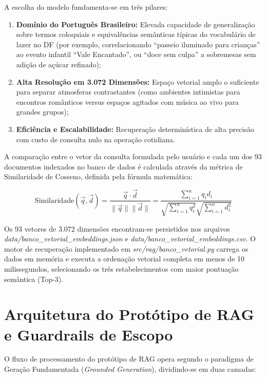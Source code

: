 \documentclass[11pt,a4paper]{article}
\begin{document}
A escolha do modelo fundamenta-se em três pilares:
\begin{enumerate}[label=\alph*)]
\item \textbf{Domínio do Português Brasileiro:} Elevada capacidade de generalização sobre termos coloquiais e equivalências semânticas típicas do vocabulário de lazer no DF (por exemplo, correlacionando ``passeio iluminado para crianças'' ao evento infantil ``Vale Encantado'', ou ``doce sem culpa'' a sobremesas sem adição de açúcar refinado);
\item \textbf{Alta Resolução em 3.072 Dimensões:} Espaço vetorial amplo o suficiente para separar atmosferas contrastantes (como ambientes intimistas para encontros românticos versus espaços agitados com música ao vivo para grandes grupos);
\item \textbf{Eficiência e Escalabilidade:} Recuperação determinística de alta precisão com custo de consulta nulo na operação cotidiana.
\end{enumerate}

A comparação entre o vetor da consulta formulada pelo usuário e cada um dos 93 documentos indexados no banco de dados é calculada através da métrica de Similaridade de Cosseno, definida pela fórmula matemática:

\begin{equation}
\text{Similaridade}(\vec{q}, \vec{d}) = \frac{\vec{q} \cdot \vec{d}}{\|\vec{q}\| \|\vec{d}\|} = \frac{\sum_{i=1}^{n} q_i d_i}{\sqrt{\sum_{i=1}^{n} q_i^2} \sqrt{\sum_{i=1}^{n} d_i^2}}
\end{equation}

Os 93 vetores de 3.072 dimensões encontram-se persistidos nos arquivos \textit{data/banco\_vetorial\_embeddings.json} e \textit{data/banco\_vetorial\_embeddings.csv}. O motor de recuperação implementado em \textit{src/rag/banco\_vetorial.py} carrega os dados em memória e executa a ordenação vetorial completa em menos de 10 milissegundos, selecionando os três estabelecimentos com maior pontuação semântica (Top-3).

\section{Arquitetura do Protótipo de RAG e Guardrails de Escopo}

O fluxo de processamento do protótipo de RAG opera segundo o paradigma de Geração Fundamentada (\textit{Grounded Generation}), dividindo-se em duas camadas:
\end{document}
